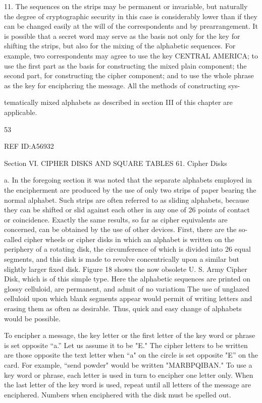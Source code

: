{{{11. The sequences on the strips may be permanent or invariable, but
naturally the degree of cryptographic security in this case is considerably
lower than if they can be changed easily at the will of the correspondents
and by prearrangement. It is possible that a secret word may serve as
the basis not only for the key for shifting the strips, but also for the
mixing of the alphabetic sequences. For example, two correspondents
may agree to use the key CENTRAL AMERICA; to use the ﬁrst part
as the basis for constructing the mixed plain component; the second part,
for constructing the cipher component; and to use the whole phrase as
the key for enciphcring the message. All the methods of constructing sys-

tematically mixed alphabets as described in section III of this chapter
are applicable.

53

 

 

 

 

 

REF ID:A56932

Section VI. CIPHER DISKS AND SQUARE TABLES
61. Cipher Disks

a. In the foregoing section it was noted that the separate alphabets
employed in the encipherment are produced by the use of only two strips
of paper bearing the normal alphabet. Such strips are often referred to
as sliding alphabets, because they can be shifted or slid against each other
in any one of 26 points of contact or coincidence. Exactly the same
results, so far as cipher equivalents are concerned, can be obtained by the
use of other devices. First, there are the so-called cipher wheels or cipher
disks in which an alphabet is written on the periphery of a rotating disk,
the circumference of which is divided into 26 equal segments, and this
disk is made to revolve concentrically upon a similar but slightly larger
ﬁxed disk. Figure 18 shows the now obsolete U. S. Army Cipher Disk,
which is of this simple type. Here the alphabetic sequences are printed
on glossy celluloid, are permanent, and admit of no variatiom The
use of unglazed celluloid upon which blank segments appear would
permit of writing letters and erasing them as often as desirable. Thus,
quick and easy change of alphabets would be possible.

 

To encipher a message, the key letter or the ﬁrst letter of the
key word or phrase is set opposite “a.” Let us assume it
to be "E." The cipher letters to be written are those
opposite the text letter when “a" on the circle is set
opposite "E” on the card. For example, “send powder"
would be written "MARBPQIBAN." To use a key word
or phrase, each letter is used in turn to encipher one letter
only. When the last letter of the key word is used, repeat
until all letters of the message are enciphered. Numbers
when enciphered with the disk must be spelled out.

}}}
